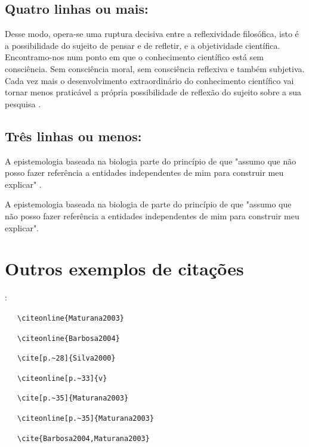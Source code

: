 \subsection{Quatro linhas ou mais:}

\begin{citacao}
    Desse modo, opera-se uma ruptura decisiva entre a reflexividade filosófica, isto é a possibilidade do sujeito de pensar e de refletir, e a objetividade científica. Encontramo-nos num ponto em que o conhecimento científico está sem consciência. Sem consciência moral, sem consciência reflexiva e também subjetiva. Cada vez mais o desenvolvimento extraordinário do conhecimento científico vai tornar menos praticável a própria possibilidade de reflexão do sujeito sobre a sua pesquisa \cite[p.~28]{Silva2000}.
\end{citacao}

\subsection{Três linhas ou menos:}

A epistemologia baseada na biologia parte do princípio de que "assumo que não posso fazer referência a entidades independentes de mim para construir meu explicar" \cite[p.~35]{Maturana2003}.
\vspace{5mm}

A epistemologia baseada na biologia de  parte do princípio de que "assumo que não posso fazer referência a entidades independentes de mim para construir meu explicar".

\section{Outros exemplos de citações}:

 \ \ \  \verb|\citeonline{Maturana2003}|

 \ \ \   \verb|\citeonline{Barbosa2004}|

\cite[p.~28]{Silva2000} \ \ \  \verb|\cite[p.~28]{Silva2000}|

 \ \ \   \verb|\citeonline[p.~33]{v}|

\cite[p.~35]{Maturana2003} \ \ \   \verb|\cite[p.~35]{Maturana2003}|

 \ \ \   \verb|\citeonline[p.~35]{Maturana2003}|

\cite{Barbosa2004,Maturana2003} \ \ \   \verb|\cite{Barbosa2004,Maturana2003}|

